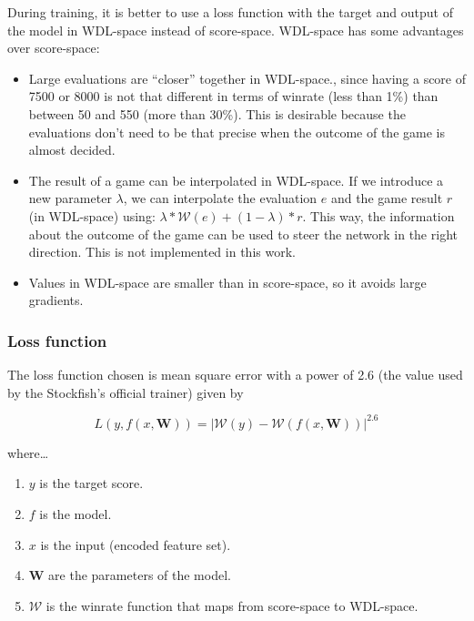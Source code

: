 During training, it is better to use a loss function with the target and output of the model in WDL-space instead of score-space. WDL-space has some advantages over score-space:

\begin{itemize}
\item Large evaluations are \enquote{closer} together in WDL-space., since having a score of 7500 or 8000 is not that different in terms of winrate (less than 1\%) than between 50 and 550 (more than 30\%). This is desirable because the evaluations don't need to be that precise when the outcome of the game is almost decided.
\item The result of a game can be interpolated in WDL-space. If we introduce a new parameter $\lambda$, we can interpolate the evaluation $e$ and the game result $r$ (in WDL-space) using: $\lambda * \mathcal{W}(e) + (1 - \lambda) * r$. This way, the information about the outcome of the game can be used to steer the network in the right direction. This is not implemented in this work.
\item Values in WDL-space are smaller than in score-space, so it avoids large gradients.
\end{itemize}




\subsubsection{Loss function}

The loss function chosen is mean square error with a power of 2.6 (the value used by the Stockfish's official trainer) given by


\[
L(y,f(x,\bm{W}))= \left| \mathcal{W}(y) - \mathcal{W}(f(x,\bm{W})) \right| ^{2.6}
\]


where\dots

\begin{enumerate}
\itemsep0em
\item $y$ is the target score.
\item $f$ is the model.
\item $x$ is the input (encoded feature set).
\item $\bm{W}$ are the parameters of the model.
\item $\mathcal{W}$ is the winrate function that maps from score-space to WDL-space.
\end{enumerate}

